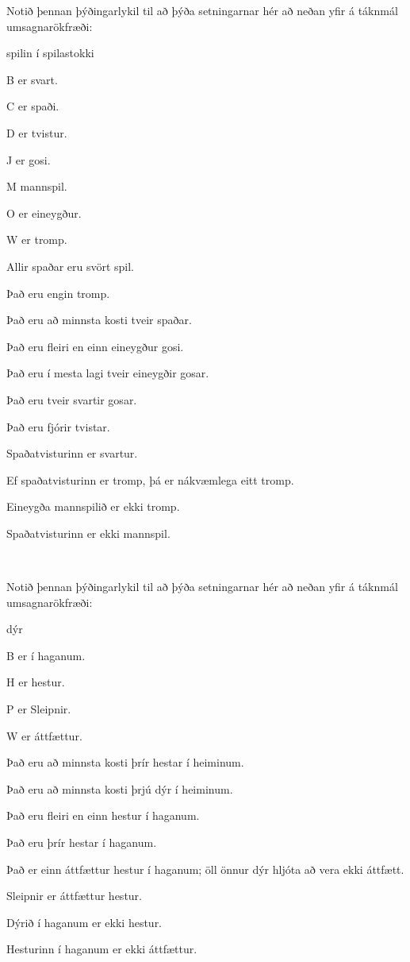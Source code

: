 \problempart
\label{pr.FOLcards}
Notið þennan þýðingarlykil til að þýða setningarnar hér að neðan yfir á táknmál umsagnarökfræði:
\begin{ekey}
\item[\text{yfirgrip}] spilin í spilastokki
\item[B]  er svart.
\item[C]  er spaði.
\item[D]  er tvistur.
\item[J]  er gosi.
\item[M]  mannspil.
\item[O]  er eineygður.
\item[W]  er tromp.
\end{ekey}

\begin{earg}
\item Allir spaðar eru svört spil.
\item Það eru engin tromp.
\item Það eru að minnsta kosti tveir spaðar.
\item Það eru fleiri en einn eineygður gosi.
\item Það eru í mesta lagi tveir eineygðir gosar.
\item Það eru tveir svartir gosar.
\item Það eru fjórir tvistar.
\item Spaðatvisturinn er svartur.
\item Ef spaðatvisturinn er tromp, þá er nákvæmlega eitt tromp.
\item Eineygða mannspilið er ekki tromp.
\item Spaðatvisturinn er ekki mannspil.
\end{earg}

\

\problempart 
Notið þennan þýðingarlykil til að þýða setningarnar hér að neðan yfir á táknmál umsagnarökfræði:
\begin{ekey}
\item[\text{yfirgrip}] dýr
\item[B]  er í haganum.
\item[H]  er hestur.
\item[P]  er Sleipnir.
\item[W]  er áttfættur.
\end{ekey}
\begin{earg}
\item Það eru að minnsta kosti þrír hestar í heiminum.
\item Það eru að minnsta kosti þrjú dýr í heiminum.
\item Það eru fleiri en einn hestur í haganum.
\item Það eru þrír hestar í haganum.
\item Það er einn áttfættur hestur í haganum; öll önnur dýr hljóta að vera ekki áttfætt.
\item Sleipnir er áttfættur hestur.
\item Dýrið í haganum er ekki hestur.
\item Hesturinn í haganum er ekki áttfættur.

\end{earg}

